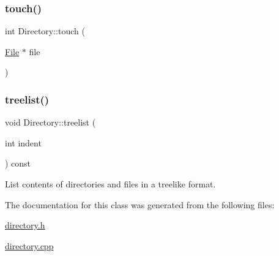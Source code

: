 \mbox{\label{class_directory_ab78fbd1a38c3e9f3926372f9fb2ccf5e}} 
\subsubsection{\texorpdfstring{touch()}{touch()}\hspace{0.1cm}{\footnotesize\ttfamily [2/2]}}
{\footnotesize\ttfamily int Directory\+::touch (\begin{DoxyParamCaption}\item[{\hyperlink{class_file}{File} $\ast$}]{file }\end{DoxyParamCaption})}

\mbox{\label{class_directory_af21c038562a88b24df0cb6e0c361febd}} 
\subsubsection{\texorpdfstring{treelist()}{treelist()}}
{\footnotesize\ttfamily void Directory\+::treelist (\begin{DoxyParamCaption}\item[{int}]{indent }\end{DoxyParamCaption}) const}



List contents of directories and files in a treelike format. 



The documentation for this class was generated from the following files\+:\begin{DoxyCompactItemize}
\item 
\hyperlink{directory_8h}{directory.\+h}\item 
\hyperlink{directory_8cpp}{directory.\+cpp}\end{DoxyCompactItemize}
